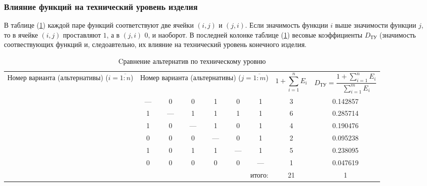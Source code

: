 \subsubsection{Влияние функций на технический уровень изделия}
В таблице (\ref{tbl_technical_lvl_comparison}) каждой паре функций
соответствуют две ячейки $(i, j)$ и $(j, i)$.
Если значимость функции $i$ выше значимости функции
$j$, то в ячейке $(i, j)$ проставляют $1$, а в $(j, i)$ $0$, и наоборот.
В последней колонке таблице (\ref{tbl_technical_lvl_comparison}) весовые
коэффициенты $D_{\text{ТУ}}$ (значимость соотвествующих функций и, следоавтельно,
их влияние на технический уровень конечного изделия.
\begin{table}[H]
    \centering
    \begin{tabular}{|c|c|c|c|c|c|c|c|c|}
        \hline
        \multirow{2}{2.4cm}{
            \centering
            Номер варианта (альтернативы) ($i = \overline{1:n}$)
        } &
        \multicolumn{6}{c|}{
            \parbox[t]{2.4cm}{
                \centering
                Номер варианта (альтернативы) ($j = \overline{1:m}$)
            }
        } &
        \multirow{2}{1.7cm}[0pt]{
            \centering
            $$1 + \sum_{i=1}^n E_i$$
        } &
        \multirow{2}{3.2cm}{
            \centering
            $$ D_\text{ТУ} = \frac{1 + \sum_{i=1}^n E_i}{\sum_{i=1}^m E_i}$$
        } \\
        &
        \centering{1} &
        \centering{2} &
        \centering{3} &
        \centering{4} &
        \centering{5} &
        \centering{6} & & \\
        \hline \hline
        \centering{1} &---& 0 & 0 & 1 & 0 & 1 & 3 & 0.142857 \\ \hline
        \centering{2} & 1 &---& 1 & 1 & 1 & 1 & 6 & 0.285714 \\ \hline
        \centering{3} & 1 & 0 &---& 1 & 0 & 1 & 4 & 0.190476 \\ \hline
        \centering{4} & 0 & 0 & 0 &---& 0 & 1 & 2 & 0.095238 \\ \hline
        \centering{5} & 1 & 0 & 1 & 1 &---& 1 & 5 & 0.238095 \\ \hline
        \centering{6} & 0 & 0 & 0 & 0 & 0 &---& 1 & 0.047619 \\ \hline
        \hline
        \multicolumn{7}{|r|}{итого:} & 21 & 1 \\
        \hline
    \end{tabular}
    \caption{Cравнение альтернатив по техническому уровню}
    \label{tbl_technical_lvl_comparison}
\end{table}

